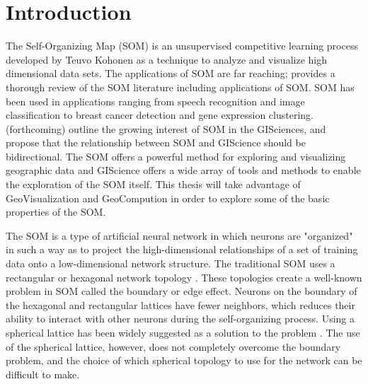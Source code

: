 \documentclass[10pt,titlepage]{article}
\begin{document}
\section{Introduction}
The Self-Organizing Map (SOM) is an unsupervised competitive learning process
developed by Teuvo Kohonen as a technique to analyze and visualize high
dimensional data sets.  The applications of SOM are far reaching;
\cite{Kohonen2000} provides a thorough review of the SOM literature including
applications of SOM.  SOM has been used in applications ranging from speech
recognition and image classification to breast cancer detection and gene
expression clustering.  \citeauthor{skupin07} (forthcoming) outline the growing interest of SOM in
the GISciences, and propose that the relationship between SOM and GIScience
should be bidirectional.  The SOM offers a powerful method for exploring and
visualizing geographic data and GIScience offers a wide array of tools
and methods to enable the exploration of the SOM itself.  This thesis will take
advantage of GeoVisualization and GeoCompution in order to explore some of the basic
properties of the SOM.

The SOM is a type of artificial neural network in which neurons are "organized"
in such a way as to project the high-dimensional relationships of a set of
training data onto a low-dimensional network structure.  The traditional
SOM uses a rectangular or hexagonal network topology \citep{Kohonen2000}.  These topologies 
create a well-known problem in SOM called the boundary or edge effect.  Neurons on
the boundary of the hexagonal and rectangular lattices have fewer neighbors,
which reduces their ability to interact with other neurons during the
self-organizing process.  Using a spherical lattice has been widely suggested as a
solution to the problem \citep{ritter99, boudjemai2003, sangole03,
Nishio:2006fk, wu2006}. The use of the spherical lattice, however, does not
completely overcome the boundary problem, and the choice of which spherical
topology to use for the network can be difficult to make.
\end{document}
